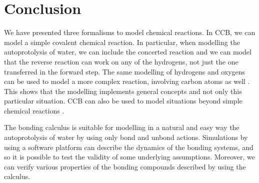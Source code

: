 \documentclass[runningheads]{llncs}
\begin{document}
\section{Conclusion}

We have presented three formalisms to model chemical reactions. In CCB, we can model a simple covalent chemical reaction. In particular, when modelling the autoprotolysis of water, we can include the concerted reaction and we can model that the reverse reaction can work on any of the hydrogens, not just the one transferred in the forward step. The same modelling of hydrogens and oxygens can be used to model a more complex reaction, involving carbon atoms as well \cite{KUHN201818}. This shows that the modelling implements general concepts and not only this particular situation. CCB can also be used to model situations beyond simple chemical reactions  \cite{merevcomp2018}.

The bonding calculus is suitable for modelling in a natural and easy way the autoprotolysis of water by using only bond and unbond actions. Simulations by using a software platform can describe the dynamics of the bonding systems, and so it is possible to test the validity of some underlying assumptions. Moreover, we can verify various properties of the bonding compounds described by using the calculus.
\end{document}
